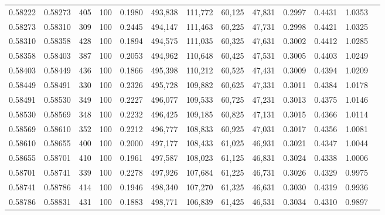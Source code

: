 \begin{tabular}{rrrrrrrrrrrrr}
0.58222 & 0.58273 &   405 & 100 &                                     0.1980 & 493,838 & 111,772 &  60,125 &  47,831 & 0.2997 & 0.4431 & 1.0353 \\
0.58273 & 0.58310 &   309 & 100 &                                     0.2445 & 494,147 & 111,463 &  60,225 &  47,731 & 0.2998 & 0.4421 & 1.0325 \\
0.58310 & 0.58358 &   428 & 100 &                                     0.1894 & 494,575 & 111,035 &  60,325 &  47,631 & 0.3002 & 0.4412 & 1.0285 \\
0.58358 & 0.58403 &   387 & 100 &                                     0.2053 & 494,962 & 110,648 &  60,425 &  47,531 & 0.3005 & 0.4403 & 1.0249 \\
0.58403 & 0.58449 &   436 & 100 &                                     0.1866 & 495,398 & 110,212 &  60,525 &  47,431 & 0.3009 & 0.4394 & 1.0209 \\
0.58449 & 0.58491 &   330 & 100 &                                     0.2326 & 495,728 & 109,882 &  60,625 &  47,331 & 0.3011 & 0.4384 & 1.0178 \\
0.58491 & 0.58530 &   349 & 100 &                                     0.2227 & 496,077 & 109,533 &  60,725 &  47,231 & 0.3013 & 0.4375 & 1.0146 \\
0.58530 & 0.58569 &   348 & 100 &                                     0.2232 & 496,425 & 109,185 &  60,825 &  47,131 & 0.3015 & 0.4366 & 1.0114 \\
0.58569 & 0.58610 &   352 & 100 &                                     0.2212 & 496,777 & 108,833 &  60,925 &  47,031 & 0.3017 & 0.4356 & 1.0081 \\
0.58610 & 0.58655 &   400 & 100 &                                     0.2000 & 497,177 & 108,433 &  61,025 &  46,931 & 0.3021 & 0.4347 & 1.0044 \\
0.58655 & 0.58701 &   410 & 100 &                                     0.1961 & 497,587 & 108,023 &  61,125 &  46,831 & 0.3024 & 0.4338 & 1.0006 \\
0.58701 & 0.58741 &   339 & 100 &                                     0.2278 & 497,926 & 107,684 &  61,225 &  46,731 & 0.3026 & 0.4329 & 0.9975 \\
0.58741 & 0.58786 &   414 & 100 &                                     0.1946 & 498,340 & 107,270 &  61,325 &  46,631 & 0.3030 & 0.4319 & 0.9936 \\
0.58786 & 0.58831 &   431 & 100 &                                     0.1883 & 498,771 & 106,839 &  61,425 &  46,531 & 0.3034 & 0.4310 & 0.9897 \\

\end{tabular}
